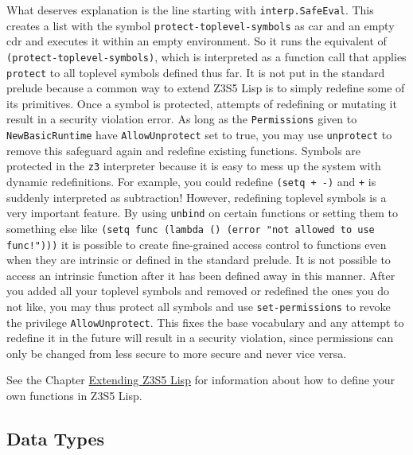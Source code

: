 \documentclass[
]{article}
\newcommand{\passthrough}[1]{#1}
\begin{document}
What deserves explanation is the line starting with
\passthrough{\lstinline!interp.SafeEval!}. This creates a list with the
symbol \passthrough{\lstinline!protect-toplevel-symbols!} as car and an
empty cdr and executes it within an empty environment. So it runs the
equivalent of \passthrough{\lstinline!(protect-toplevel-symbols)!},
which is interpreted as a function call that applies
\passthrough{\lstinline!protect!} to all toplevel symbols defined thus
far. It is not put in the standard prelude because a common way to
extend Z3S5 Lisp is to simply redefine some of its primitives. Once a
symbol is protected, attempts of redefining or mutating it result in a
security violation error. As long as the
\passthrough{\lstinline!Permissions!} given to
\passthrough{\lstinline!NewBasicRuntime!} have
\passthrough{\lstinline!AllowUnprotect!} set to true, you may use
\passthrough{\lstinline!unprotect!} to remove this safeguard again and
redefine existing functions. Symbols are protected in the
\passthrough{\lstinline!z3!} interpreter because it is easy to mess up
the system with dynamic redefinitions. For example, you could redefine
\passthrough{\lstinline!(setq + -)!} and \passthrough{\lstinline!+!} is
suddenly interpreted as subtraction! However, redefining toplevel
symbols is a very important feature. By using
\passthrough{\lstinline!unbind!} on certain functions or setting them to
something else like
\passthrough{\lstinline'(setq func (lambda () (error "not allowed to use func!")))'}
it is possible to create fine-grained access control to functions even
when they are intrinsic or defined in the standard prelude. It is not
possible to access an intrinsic function after it has been defined away
in this manner. After you added all your toplevel symbols and removed or
redefined the ones you do not like, you may thus protect all symbols and
use \passthrough{\lstinline!set-permissions!} to revoke the privilege
\passthrough{\lstinline!AllowUnprotect!}. This fixes the base vocabulary
and any attempt to redefine it in the future will result in a security
violation, since permissions can only be changed from less secure to
more secure and never vice versa.

See the Chapter \protect\hyperlink{extending-z3s5-lisp}{Extending Z3S5
Lisp} for information about how to define your own functions in Z3S5
Lisp.

\hypertarget{data-types}{%
\subsection{Data Types}\label{data-types}}
\end{document}
